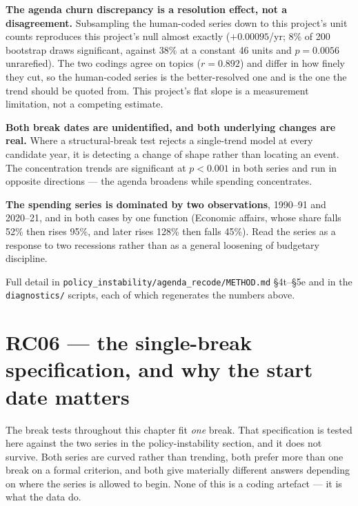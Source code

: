 \begin{threeparttable}
\begin{tablenotes}\footnotesize
\item \textbf{The agenda churn discrepancy is a resolution effect, not a disagreement.} Subsampling
the human-coded series down to this project's unit counts reproduces this project's null almost
exactly ($+0.00095$/yr; 8\% of 200 bootstrap draws significant, against 38\% at a constant 46 units
and $p=0.0056$ unrarefied). The two codings agree on topics ($r=0.892$) and differ in how finely
they cut, so the human-coded series is the better-resolved one and is the one the trend should be
quoted from. This project's flat slope is a measurement limitation, not a competing estimate.
\item \textbf{Both break dates are unidentified, and both underlying changes are real.} Where a
structural-break test rejects a single-trend model at every candidate year, it is detecting a change
of shape rather than locating an event. The concentration trends are significant at $p<0.001$ in
both series and run in opposite directions --- the agenda broadens while spending concentrates.
\item \textbf{The spending series is dominated by two observations}, 1990--91 and 2020--21, and in
both cases by one function (Economic affairs, whose share falls 52\% then rises 95\%, and later rises
128\% then falls 45\%). Read the series as a response to two recessions rather than as a general
loosening of budgetary discipline.
\item Full detail in \texttt{policy\_instability/agenda\_recode/METHOD.md} \S4t--\S5e and in the
\texttt{diagnostics/} scripts, each of which regenerates the numbers above.
\end{tablenotes}
\end{threeparttable}

\section{RC06 --- the single-break specification, and why the start date matters}

The break tests throughout this chapter fit \emph{one} break. That specification is tested here
against the two series in the policy-instability section, and it does not survive. Both series are
curved rather than trending, both prefer more than one break on a formal criterion, and both give
materially different answers depending on where the series is allowed to begin. None of this is a
coding artefact --- it is what the data do.

